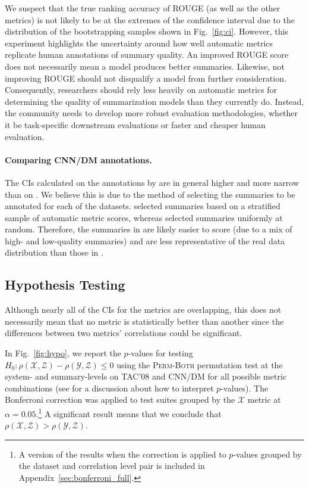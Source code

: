 We suspect that the true ranking accuracy of ROUGE (as well as the other metrics) is not likely to be at the extremes of the confidence interval due to the distribution of the bootstrapping samples shown in Fig.~\ref{fig:ci}.
However, this experiment highlights the uncertainty around how well automatic metrics replicate human annotations of summary quality.
An improved ROUGE score does not necessarily mean a model produces better summaries.
Likewise, not improving ROUGE should not disqualify a model from further consideration.
Consequently, researchers should rely less heavily on automatic metrics for determining the quality of summarization models than they currently do.
Instead, the community needs to develop more robust evaluation methodologies, whether it be task-specific downstream evaluations or faster and cheaper human evaluation. 




\paragraph{Comparing CNN/DM annotations.}
The CIs calculated on the annotations by \citet{BGALN20} are in general higher and more narrow than on \citet{FKMSR21}.
We believe this is due to the method of selecting the summaries to be annotated for each of the datasets.
\citet{BGALN20} selected summaries based on a stratified sample of automatic metric scores, whereas \citet{FKMSR21} selected summaries uniformly at random.
Therefore, the summaries in \citet{BGALN20} are likely easier to score (due to a mix of high- and low-quality summaries) and are less representative of the real data distribution than those in \citet{FKMSR21}.







\subsection{Hypothesis Testing}
\label{sec:hypo_experiments}
Although nearly all of the CIs for the metrics are overlapping, this does not necessarily mean that no metric is statistically better than another since the differences between two metrics' correlations could be significant.

In Fig.~\ref{fig:hypo}, we report the $p$-values for testing $H_0: \rho(\mathcal{X}, \mathcal{Z}) - \rho(\mathcal{Y}, \mathcal{Z}) \leq 0$ using the \textsc{Perm-Both} permutation test at the system- and summary-levels on TAC'08 and CNN/DM for all possible metric combinations (see \citet{AKSR20} for a discussion about how to interpret $p$-values).
The Bonferroni correction \citep[which lowers the significance level for rejecting each individual null hypothesis such that the probability of making one or more type-I errors is bounded by $\alpha$;][]{Bonferroni36,DBBR17} was applied to test suites grouped by the $\mathcal{X}$ metric at $\alpha = 0.05$.\footnote{
    A version of the results when the correction is applied to $p$-values grouped by the dataset and correlation level pair is included in Appendix~\ref{sec:bonferroni_full}.
}
A significant result means that we conclude that $\rho(\mathcal{X}, \mathcal{Z}) > \rho(\mathcal{Y}, \mathcal{Z})$.

